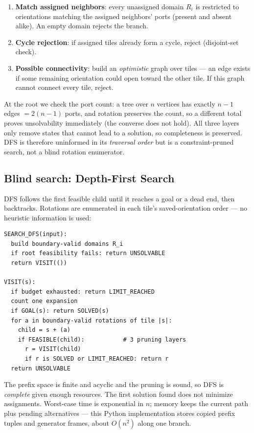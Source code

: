 \begin{enumerate}
\item \textbf{Match assigned neighbors}: every unassigned domain $R_i$ is
restricted to orientations matching the assigned neighbors' ports (present and
absent alike). An empty domain rejects the branch.
\item \textbf{Cycle rejection}: if assigned tiles already form a cycle, reject
(disjoint-set check).
\item \textbf{Possible connectivity}: build an \emph{optimistic} graph over tiles
--- an edge exists if some remaining orientation could open toward the other
tile. If this graph cannot connect every tile, reject.
\end{enumerate}

At the root we check the port count: a tree over $n$ vertices has exactly $n-1$
edges $=2(n-1)$ ports, and rotation preserves the count, so a different total
proves unsolvability immediately (the converse does not hold). All three layers
only remove states that cannot lead to a solution, so completeness is preserved.
DFS is therefore uninformed in its \emph{traversal order} but is a
constraint-pruned search, not a blind rotation enumerator.

\subsection{Blind search: Depth-First Search}

DFS follows the first feasible child until it reaches a goal or a dead end, then
backtracks. Rotations are enumerated in each tile's saved-orientation order ---
no heuristic information is used:

\begin{lstlisting}
SEARCH_DFS(input):
  build boundary-valid domains R_i
  if root feasibility fails: return UNSOLVABLE
  return VISIT(())

VISIT(s):
  if budget exhausted: return LIMIT_REACHED
  count one expansion
  if GOAL(s): return SOLVED(s)
  for a in boundary-valid rotations of tile |s|:
    child = s + (a)
    if FEASIBLE(child):           # 3 pruning layers
      r = VISIT(child)
      if r is SOLVED or LIMIT_REACHED: return r
  return UNSOLVABLE
\end{lstlisting}

The prefix space is finite and acyclic and the pruning is sound, so DFS is
\emph{complete} given enough resources. The first solution found does not
minimize assignments. Worst-case time is exponential in $n$; memory keeps the
current path plus pending alternatives --- this Python implementation stores
copied prefix tuples and generator frames, about $O(n^2)$ along one branch.

